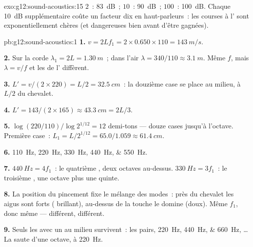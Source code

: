 \begin{solution}{exo:g12:sound-acoustics:15}
$2$~: \qty{83}{dB}~; $10$~: \qty{90}{dB}~; $100$~: \qty{100}{dB}. Chaque
\qty{+10}{dB} supplémentaire coûte un facteur dix en haut-parleurs~: les
courses à l' sont exponentiellement chères (et
dangereuses bien avant d'être gagnées).
\end{solution}

\begin{solution}{pb:g12:sound-acoustics:1}
\textbf{1.} $v = 2Lf_1 = 2 \times 0.650 \times 110 = \qty{143}{m/s}$.

\textbf{2.} Sur la corde $\lambda_1 = 2L = \qty{1.30}{m}$~; dans l'air
$\lambda = 340/110 \approx \qty{3.1}{m}$. Même $f$, mais
$\lambda = v/f$ et les  de l' diffèrent.

\textbf{3.} $L' = v/(2 \times 220) = L/2 = \qty{32.5}{cm}$~: la
douzième case se place au milieu, à $L/2$ du chevalet.

\textbf{4.} $L' = 143/(2 \times 165) \approx \qty{43.3}{cm} = 2L/3$.

\textbf{5.} $\log(220/110)/\log 2^{1/12} = 12$ demi-tons --- douze
cases jusqu'à l'octave. Première case~: $L_1 = L/2^{1/12} = 65.0/1.059
\approx \qty{61.4}{cm}$.

\textbf{6.} \qtylist{110;220;330;440;550}{Hz}.

\textbf{7.} $\qty{440}{Hz} = 4f_1$~: le quatrième , deux
octaves au-dessus. $\qty{330}{Hz} = 3f_1$~: le troisième
, une octave plus une quinte.

\textbf{8.} La position du pincement fixe le mélange des modes~: près
du chevalet les  aigus sont forts (
brillant), au-dessus de la touche le  domine
(doux). Même $f_1$, donc même  --- 
différent,  différent.

\textbf{9.} Seuls les  avec un  au
milieu survivent~: les pairs, \qtylist{220;440;660}{Hz}, \dots La
 saute d'une octave, à \qty{220}{Hz}.


\end{solution}
